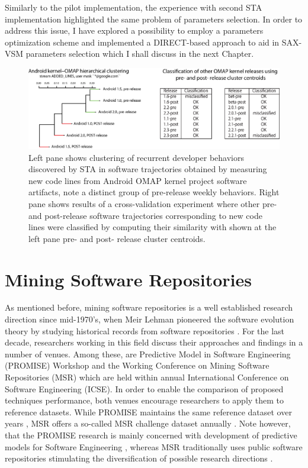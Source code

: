 Similarly to the pilot implementation, the experience with second STA implementation highlighted the same problem of 
parameters selection. In order to address this issue, I have explored a possibility to employ a parameters optimization 
scheme and implemented a DIRECT-based approach \cite{citeulike:12563460} to aid in SAX-VSM parameters selection 
which I shall discuss in the next Chapter.

\begin{figure}[t]
   \centering
   \includegraphics[width=145mm]{figures/STA2-draft.eps}
   \caption{
   Left pane shows clustering of recurrent developer behaviors discovered by STA in software trajectories obtained by 
   measuring new code lines from Android OMAP kernel project software artifacts, note a distinct group of pre-release weekly 
   behaviors.  
   Right pane shows results of a cross-validation experiment where other pre- and post-release software trajectories 
   corresponding to new code lines were classified by computing their similarity with shown at the left pane pre- and 
   post- release  cluster centroids.}
   \label{fig:STA2-results}
\end{figure}

\section{Mining Software Repositories}
As mentioned before, mining software repositories is a well established research direction since 
mid-1970's, when Meir Lehman pioneered the software evolution theory by studying historical records from 
software repositories \cite{citeulike:2739216}. 
For the last decade, researchers working in this field discuss their approaches and findings in a number of venues. 
Among these, are Predictive Model in Software Engineering (PROMISE) Workshop and the Working Conference on Mining 
Software Repositories (MSR) which are held within annual International Conference on Software Engineering (ICSE).
In order to enable the comparison of proposed techniques performance, both venues encourage researchers to 
apply them to reference datasets. 
While PROMISE maintains the same reference dataset over years \cite{promise12}, 
MSR offers a so-called MSR challenge dataset annually \cite{MSRChallenge2012} \cite{MSRChallenge2013}.
Note however, that the {PROMISE} research is mainly concerned with development of predictive models for 
Software Engineering \cite{Menzies13}, whereas MSR traditionally uses public software repositories stimulating 
the diversification of possible research directions \cite{citeulike:12550438} \cite{citeulike:2710928} \cite{citeulike:7853299}.

